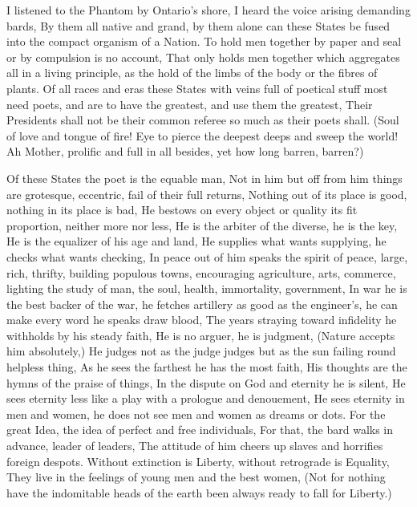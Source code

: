 \documentclass[11pt]{book}
\newenvironment {poem} [1]
 {\titulus{#1}%
  \versus
  \Nstanza{0}%
  \numerus{1}}
 {\endversus}
\begin{document}
\begin{poem}{By Blue Ontario's Shore}
I listened to the Phantom by Ontario's shore,
I heard the voice arising demanding bards,
By them all native and grand, by them alone can these States be %
    fused into the compact organism of a Nation.
     \vacua
To hold men together by paper and seal or by compulsion is no account,
That only holds men together which aggregates all in a living principle, %
    as the hold of the limbs of the body or the fibres of plants.
     \vacua
Of all races and eras these States with veins full of poetical stuff most %
    need poets, and are to have the greatest, and use them the greatest,
Their Presidents shall not be their common referee so much as their %
    poets shall.
     \vacua
(Soul of love and tongue of fire!
Eye to pierce the deepest deeps and sweep the world!
Ah Mother, prolific and full in all besides, yet how long barren, barren?)

\stropha %

Of these States the poet is the equable man,
Not in him but off from him things are grotesque, eccentric, fail of %
    their full returns,
Nothing out of its place is good, nothing in its place is bad,
He bestows on every object or quality its fit proportion, neither %
    more nor less,
He is the arbiter of the diverse, he is the key,
He is the equalizer of his age and land,
He supplies what wants supplying, he checks what wants checking,
In peace out of him speaks the spirit of peace, large, rich, %
    thrifty, building populous towns, encouraging agriculture, arts, %
    commerce, lighting the study of man, the soul, health, %
    immortality, government,
In war he is the best backer of the war, he fetches artillery as %
    good as the engineer's, he can make every word he speaks draw blood,
The years straying toward infidelity he withholds by his steady faith,
He is no arguer, he is judgment, (Nature accepts him absolutely,)
He judges not as the judge judges but as the sun failing round %
    helpless thing,
As he sees the farthest he has the most faith,
His thoughts are the hymns of the praise of things,
In the dispute on God and eternity he is silent,
He sees eternity less like a play with a prologue and denouement,
He sees eternity in men and women, he does not see men and women %
    as dreams or dots.
     \vacua
For the great Idea, the idea of perfect and free individuals,
For that, the bard walks in advance, leader of leaders,
The attitude of him cheers up slaves and horrifies foreign despots.
     \vacua
Without extinction is Liberty, without retrograde is Equality,
They live in the feelings of young men and the best women,
(Not for nothing have the indomitable heads of the earth been always %
    ready to fall for Liberty.)



\end{poem}
\end{document}
